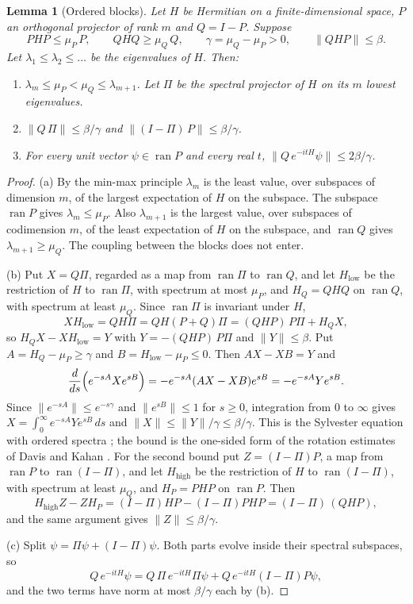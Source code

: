 \documentclass[11pt]{article}
\newtheorem{lemma}[theorem]{Lemma}
\theoremstyle{definition}
\theoremstyle{remark}
\theoremstyle{plain}
\newcommand{\ran}{\operatorname{ran}}
\begin{document}
\begin{lemma}[Ordered blocks]
\label{lem:blocks}
Let $H$ be Hermitian on a finite-dimensional space, $P$ an orthogonal
projector of rank $m$ and $Q=I-P$. Suppose
\[
PHP\le\mu_P\,P,\qquad QHQ\ge\mu_Q\,Q,\qquad\gamma=\mu_Q-\mu_P>0,\qquad
\lVert QHP\rVert\le\beta .
\]
Let $\lambda_1\le\lambda_2\le\dots$ be the eigenvalues of $H$. Then:
\begin{enumerate}[label=\textup{(\alph*)},leftmargin=2.2em,itemsep=1pt]
\item $\lambda_m\le\mu_P<\mu_Q\le\lambda_{m+1}$. Let $\Pi$ be the spectral
projector of $H$ on its $m$ lowest eigenvalues.
\item $\lVert Q\,\Pi\rVert\le\beta/\gamma$ and
$\lVert(I-\Pi)\,P\rVert\le\beta/\gamma$.
\item For every unit vector $\psi\in\ran P$ and every real $t$,
$\lVert Q\,e^{-itH}\psi\rVert\le2\beta/\gamma$.
\end{enumerate}
\end{lemma}

\begin{proof}
(a) By the min-max principle $\lambda_m$ is the least value, over subspaces
of dimension $m$, of the largest expectation of $H$ on the subspace. The
subspace $\ran P$ gives $\lambda_m\le\mu_P$. Also $\lambda_{m+1}$ is the
largest value, over subspaces of codimension $m$, of the least expectation
of $H$ on the subspace, and $\ran Q$ gives $\lambda_{m+1}\ge\mu_Q$. The
coupling between the blocks does not enter.

(b) Put $X=Q\Pi$, regarded as a map from $\ran\Pi$ to $\ran Q$, and let
$H_{\mathrm{low}}$ be the restriction of $H$ to $\ran\Pi$, with spectrum at
most $\mu_P$, and $H_Q=QHQ$ on $\ran Q$, with spectrum at least $\mu_Q$.
Since $\ran\Pi$ is invariant under $H$,
\[
XH_{\mathrm{low}}=QH\Pi=QH(P+Q)\Pi=(QHP)\,P\Pi+H_QX,
\]
so $H_QX-XH_{\mathrm{low}}=Y$ with $Y=-(QHP)\,P\Pi$ and
$\lVert Y\rVert\le\beta$. Put
$A=H_Q-\mu_P\ge\gamma$ and $B=H_{\mathrm{low}}-\mu_P\le0$. Then $AX-XB=Y$
and
\[
\frac{d}{ds}\Bigl(e^{-sA}Xe^{sB}\Bigr)=-e^{-sA}(AX-XB)e^{sB}=-e^{-sA}Ye^{sB}.
\]
Since $\lVert e^{-sA}\rVert\le e^{-s\gamma}$ and $\lVert e^{sB}\rVert\le1$
for $s\ge0$, integration from $0$ to $\infty$ gives
$X=\int_0^\infty e^{-sA}Ye^{sB}\,ds$ and
$\lVert X\rVert\le\lVert Y\rVert/\gamma\le\beta/\gamma$. This is the
Sylvester equation with ordered spectra \cite{bhatia1997}; the bound is the
one-sided form of the rotation estimates of Davis and Kahan
\cite{daviskahan1970}. For the second bound put $Z=(I-\Pi)P$, a map from
$\ran P$ to $\ran(I-\Pi)$, and let $H_{\mathrm{high}}$ be the restriction of
$H$ to $\ran(I-\Pi)$, with spectrum at least $\mu_Q$, and $H_P=PHP$ on
$\ran P$. Then
\[
H_{\mathrm{high}}Z-ZH_P=(I-\Pi)HP-(I-\Pi)PHP=(I-\Pi)\,(QHP),
\]
and the same argument gives $\lVert Z\rVert\le\beta/\gamma$.

(c) Split $\psi=\Pi\psi+(I-\Pi)\psi$. Both parts evolve inside their
spectral subspaces, so
\[
Q\,e^{-itH}\psi=Q\,\Pi\,e^{-itH}\Pi\psi+Q\,e^{-itH}(I-\Pi)P\psi ,
\]
and the two terms have norm at most $\beta/\gamma$ each by (b).
\end{proof}
\end{document}

